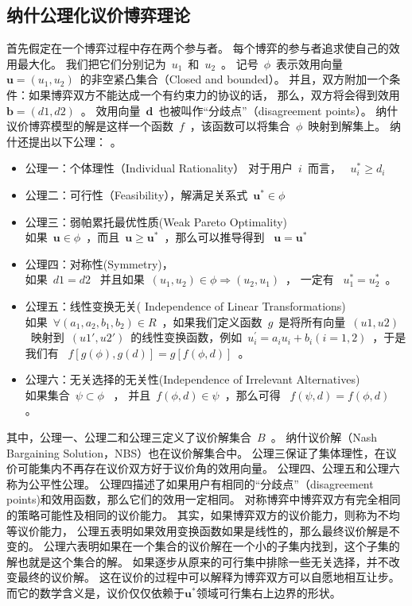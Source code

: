 \subsection{纳什公理化议价博弈理论}
首先假定在一个博弈过程中存在两个参与者。
每个博弈的参与者追求使自己的效用最大化。
我们把它们分别记为~$u_1$~和~$u_2$~。
记号~$\phi$~表示效用向量~$\mathbf{u}=(u_1, u_2)$~的非空紧凸集合（Closed and bounded）。
并且，双方附加一个条件：如果博弈双方不能达成一个有约束力的协议的话，
那么，双方将会得到效用~$\mathbf{b}=(d1, d2)$~。
效用向量~$\mathbf{d}$~也被叫作“分歧点”（disagreement points）。
纳什议价博弈模型的解是这样一个函数~$f$~，该函数可以将集合~$\phi$~映射到解集上。
纳什还提出以下公理：
\cite{Nash_1950}。
\begin{itemize}
\item 公理一：个体理性（Individual Rationality） 
    对于用户~$i$~而言， ~$u_i^* \ge d_i$~
\item 公理二：可行性（Feasibility），解满足关系式~$\mathbf{u}^* \in \phi$~
\item 公理三：弱帕累托最优性质(Weak Pareto Optimality)\\
如果~$\mathbf{u} \in \phi$~，而且~$\mathbf{u} \ge \mathbf{u}^*$~，那么可以推导得到 ~$\mathbf{u} = \mathbf{u}^*$~
\item 公理四：对称性(Symmetry)，\\
如果~$d1=d2$~ 并且如果~$(u_1, u_2) \in \phi \Rightarrow (u_2, u_1) $~， 一定有 ~$u_1^*= u_2^*$~。
\item 公理五：线性变换无关( Independence of Linear Transformations)\\ 
如果~$\forall (a_1, a_2, b_1, b_2) \in R$~，如果我们定义函数~$g$~是将所有向量~$(u1, u2)$~映射到~$(u1', u2')$~的线性变换函数，例如~$u_i^\prime=a_iu_i+ b_i (i =1,2)$~，于是我们有 ~$f[g(\phi), g(d)]=g[f(\phi , d)]$~。
\item 公理六：无关选择的无关性(Independence of Irrelevant Alternatives) \\
如果集合~$\psi \subset \phi$~ ，
并且~$f(\phi,d) \in \psi$~，那么可得 ~$f(\psi,d) = f(\phi,d)$~ 。
\end{itemize}
其中，公理一、公理二和公理三定义了议价解集合~$B$~。
纳什议价解（Nash Bargaining Solution，NBS）也在议价解集合中。
公理三保证了集体理性，在议价可能集内不再存在议价双方好于议价角的效用向量。
公理四、公理五和公理六称为公平性公理。
公理四描述了如果用户有相同的“分歧点”（disagreement points)和效用函数，那么它们的效用一定相同。
对称博弈中博弈双方有完全相同的策略可能性及相同的议价能力。
其实，如果博弈双方的议价能力，则称为不均等议价能力，
公理五表明如果效用变换函数如果是线性的，那么最终议价解是不变的。
公理六表明如果在一个集合的议价解在一个小的子集内找到，这个子集的解也就是这个集合的解。
如果逐步从原来的可行集中排除一些无关选择，并不改变最终的议价解。
这在议价的过程中可以解释为博弈双方可以自愿地相互让步。
而它的数学含义是，议价仅仅依赖于$\mathbf{u}^*$领域可行集右上边界的形状。


